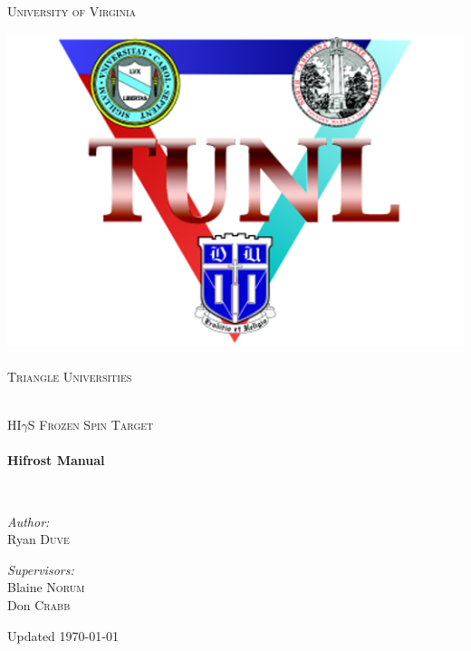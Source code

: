 \begin{titlepage}
\begin{center}
\begin{minipage}{.48\textwidth}
\textsc{\normalsize University of Virginia}\\[1.5cm]
\end{minipage}
\hfill
\noindent\begin{minipage}{.25\textwidth}
\centering
\includegraphics[width=\linewidth]{./img/tunl-logo.png}~\\[.5cm]
\textsc{\normalsize Triangle Universities}\\[1.5cm]
\end{minipage}
\\[80pt]
\textsc{\Large HI$\gamma$S Frozen Spin Target}\\[0.5cm]

\HRule \\[0.4cm]
{ \huge \bfseries Hifrost Manual \\[0.4cm] }

\HRule \\[1.5cm]

\begin{minipage}{0.4\textwidth}
\begin{flushleft} \large
\emph{Author:}\\
Ryan \textsc{Duve}
\end{flushleft}
\end{minipage}
\begin{minipage}{0.4\textwidth}
\begin{flushright} \large
\emph{Supervisors:} \\
Blaine \textsc{Norum} \\
Don \textsc{Crabb}
\end{flushright}
\end{minipage}

\vfill

{\large Updated \today}

\end{center}
\end{titlepage}
